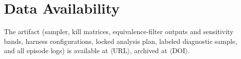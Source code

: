 \documentclass[conference]{IEEEtran}
\newcommand{\PH}[1]{\colorbox{gray!18}{\small$\langle$#1$\rangle$}}
\begin{document}
\section*{Data Availability}
The artifact (sampler, kill matrices, equivalence-filter outputs and
sensitivity bands, harness configurations, locked analysis plan,
labeled diagnostic sample, and all episode logs) is available at
\PH{URL}, archived at \PH{DOI}.

\balance


\end{document}
